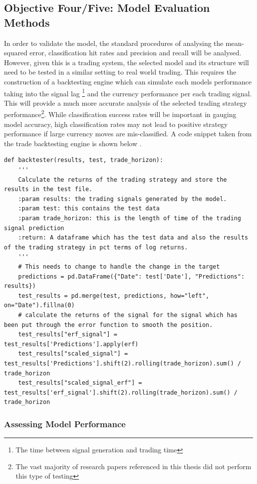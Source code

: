 \documentclass[11pt]{article}
\begin{document}
\subsection{Objective Four/Five: Model Evaluation Methods} \label{backy}
In order to validate the model, the standard procedures of analysing the mean-squared error, classification hit rates and precision and recall will be analysed. However, given this is a trading system, the selected model and its structure will need to be tested in a similar setting to real world trading. This requires the construction of a backtesting engine which can simulate each models performance taking into the signal lag \footnote{ The time between signal generation and trading time} and the currency performance per each trading signal. This will provide a much more accurate analysis of the selected trading strategy performance\footnote{The vast majority of research papers referenced in this thesis did not perform this type of testing}. While classification success rates will be important in gauging model accuracy, high classification rates may not lead to positive strategy performance if large currency moves are mis-classified. A code snippet taken from the trade backtesting engine is shown below .
\clearpage
\begin{lstlisting}
def backtester(results, test, trade_horizon):
    '''
    Calculate the returns of the trading strategy and store the results in the test file.
    :param results: the trading signals generated by the model.
    :param test: this contains the test data
    :param trade_horizon: this is the length of time of the trading signal prediction
    :return: A dataframe which has the test data and also the results of the trading strategy in pct terms of log returns.
    '''
    # This needs to change to handle the change in the target
    predictions = pd.DataFrame({"Date": test['Date'], "Predictions": results})
    test_results = pd.merge(test, predictions, how="left", on="Date").fillna(0)
    # calculate the returns of the signal for the signal which has been put through the error function to smooth the position.
    test_results["erf_signal"] = test_results['Predictions'].apply(erf)
    test_results["scaled_signal"] = test_results['Predictions'].shift(2).rolling(trade_horizon).sum() / trade_horizon
    test_results["scaled_signal_erf"] = test_results['erf_signal'].shift(2).rolling(trade_horizon).sum() / trade_horizon
\end{lstlisting}

\subsubsection{Assessing Model Performance}
\end{document}
